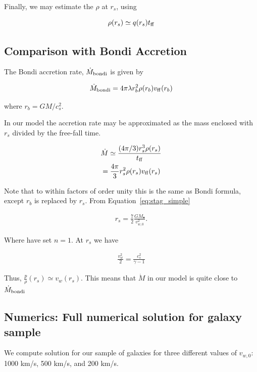 \documentclass[usenatbib,fleqn]{mn2e}
\newcommand{\Mdotb}{\dot{M}_{\rm bondi}}
\newcommand{\rs}{r_s}
\newcommand{\rb}{r_b}
\newcommand{\vw}{v_w}
\newcommand{\kew}{\frac{v_w^2}{2}}
\newcommand{\cs}{\frac{p}{\rho}}
\newcommand{\Mbh}[1][]{M_{\bullet#1}}
\newcommand{\ff}{\rm ff}
\newcommand{\tff}{t_{\ff}}
\newcommand{\vwO}{v_{w,0}}
\begin{document}
Finally, we may estimate the $\rho$ at $\rs$, using 

\begin{equation}
\rho(\rs)\simeq q(\rs) \tff
\end{equation}



\subsection{Comparison with Bondi Accretion}
The Bondi accretion rate, $\Mdotb$ is given by 

\begin{align}
\Mdotb=4\pi \lambda r_b^2 \rho(r_b) v_{\rm ff}(r_b)
\end{align}

where $r_b=G M/c_s^2$.

In our model the accretion rate may be approximated as the mass enclosed with $\rs$ divided by the free-fall time.

\begin{align}
&\dot{M}\simeq\frac{(4 \pi/3) \rs^3 \rho(\rs)}{t_{\ff}}\\
&=\frac{4 \pi}{3} \rs^2 \rho(\rs) v_{\ff}(\rs)
\end{align}

Note that to within factors of order unity this is the same as Bondi formula, except $\rb$ is replaced by $\rs$. 
From Equation~\ref{eq:stag_simple}

\begin{align}
\rs=\frac{7}{2}\frac{G \Mbh}{\vwO^2}.
\label{eq:rs_simple}
\end{align}

Where have set $n=1$.  At $\rs$ we have

\begin{align}
\kew=\frac{c_s^2}{\gamma-1}
\end{align}

Thus, $\cs(\rs)\simeq \vw(\rs)$. This means that $\dot{M}$ in our model is quite close to $\Mdotb$



\subsection{Numerics: Full numerical solution for galaxy sample}
We compute solution for our sample of galaxies for three different values of $v_{w,0}$: 1000 km/s, 500 km/s, and 200 km/s. 
\end{document}
